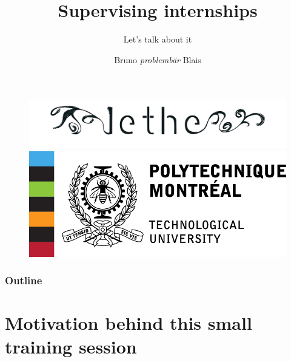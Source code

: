 \documentclass[t, 11pt,xcolor=dvipsnames]{beamer}
\title{\textbf{Supervising internships}}
\subtitle{Let's talk about it}
\author{Bruno \textit{problembär} Blais}
\begin{document}
\begin{frame}
\vspace{0.5cm}
	\begin{figure}
  		\includegraphics[scale = 0.12]{images/logo_lethe.png}\hspace*{0.2cm}
  		\includegraphics[scale = 0.4]{images/logo-poly.jpg}
	\end{figure}
	\titlepage
\end{frame}

\begin{frame}
	\frametitle{\textbf{Outline}}
	\tableofcontents
\end{frame}

\section{Motivation behind this small training session}
\end{document}
